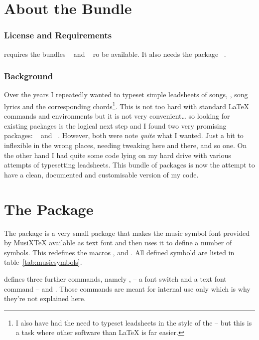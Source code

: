 \documentclass[load-preamble+]{cnltx-doc}
\begin{document}
\part{About the Bundle}

\section{License and Requirements}

\license

\leadsheets{} requires the bundles ~\cite{bnd:l3kernel} and
~\cite{bnd:l3packages} ro be available.  It also needs the
package ~\cite{pkg:translations}.

\section{Background}

Over the years I repeatedly wanted to typeset simple leadsheets of songs, \ie,
song lyrics and the corresponding chords\footnote{I also have had the need to
  typeset leadsheets in the style of the  -- but this
  is a task where other software than \LaTeX{} is far easier.}.  This is not
too hard with standard \LaTeX{} commands and environments but it is not very
convenient\ldots{} so looking for existing packages is the logical next step
and I found two very promising packages: ~\cite{pkg:songs} and
~\cite{pkg:songbook}.  However, both were note \emph{quite} what
I wanted.  Just a bit to inflexible in the wrong places, needing tweaking here
and there, and so one.  On the other hand I had quite some code lying on my
hard drive with various attempts of typesetting leadsheets.  This bundle of
packages is now the attempt to have a clean, documented and customisable
version of my code.

\part{The \musicsymbols{} Package}

The \musicsymbols{} package is a very small package that makes the music
symbol font provided by MusiX\TeX{} available as text font and then uses it to
define a number of symbols.  This redefines the macros , 
and .  All defined symbold are listed in
table~\ref{tab:musicsymbols}.

\musicsymbols{} defines three further commands, namely ,
 -- a font switch and a text font command -- and
.  Those commands are meant for internal use only which is why
they're not explained here.
\end{document}
